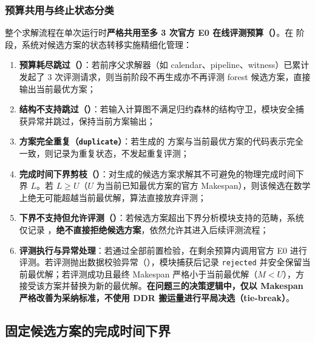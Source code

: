 \documentclass[anonymous,notoc]{gmcm2026}
\providecommand{\tightlist}{\setlength{\itemsep}{0pt}\setlength{\parskip}{0pt}}
\begin{document}
\subsubsection{预算共用与终止状态分类}

整个求解流程在单次运行时\textbf{严格共用至多 3 次官方 E0 在线评测预算（\texttt{}）}。在 \texttt{} 阶段，系统对候选方案的状态转移实施精细化管理：

\begin{enumerate}
\def\labelenumi{\arabic{enumi}.}
\tightlist
\item
  \textbf{预算耗尽跳过（\texttt{}）}：若前序父求解器（如 calendar、pipeline、witness）已累计发起了 3 次评测请求，则当前阶段不再生成亦不再评测 forest 候选方案，直接输出当前最优方案；
\item
  \textbf{结构不支持跳过（\texttt{}）}：若输入计算图不满足归约森林的结构守卫，模块安全捕获异常并跳过，保持当前方案输出；
\item
  \textbf{方案完全重复（\texttt{duplicate}）}：若生成的 \texttt{} 方案与当前最优方案的代码表示完全一致，则记录为重复状态，不发起重复评测；
\item
  \textbf{完成时间下界剪枝（\texttt{}）}：对生成的候选方案求解其不可避免的物理完成时间下界 \(L\)。若 \(L \ge U\)（\(U\) 为当前已知最优方案的官方 Makespan），则该候选在数学上绝无可能超越当前最优解，算法直接放弃评测；
\item
  \textbf{下界不支持但允许评测（\texttt{}）}：若候选方案超出下界分析模块支持的范畴，系统仅记录 \texttt{}，\textbf{绝不直接拒绝候选方案}，依然允许其进入后续评测流程；
\item
  \textbf{评测执行与异常处理}：若通过全部前置检验，在剩余预算内调用官方 E0 进行评测。若评测抛出数据校验异常（\texttt{}），模块捕获后记录 \texttt{rejected} 并安全保留当前最优解；若评测成功且最终 Makespan 严格小于当前最优解（\(M < U\)），方接受该方案并替换为新的最优解。\textbf{在问题三的决策逻辑中，仅以 Makespan 严格改善为采纳标准，不使用 DDR 搬运量进行平局决选（tie-break）}。
\end{enumerate}

\subsection{固定候选方案的完成时间下界}
\end{document}
